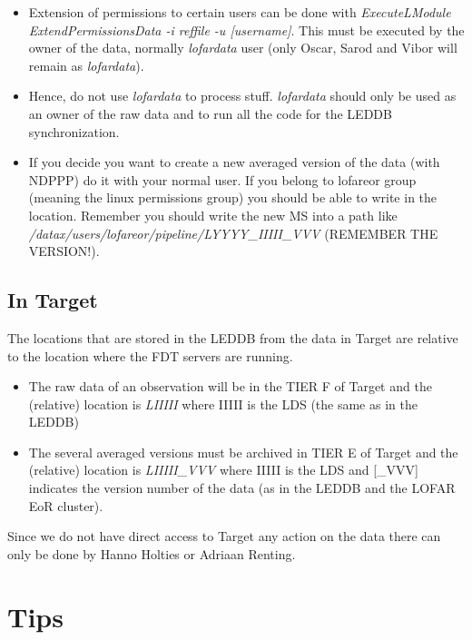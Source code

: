 \documentclass[a4paper,11pt]{article}
\begin{document}
\begin{itemize}
\item Extension of permissions to certain users can be done with \textit{ExecuteLModule ExtendPermissionsData -i reffile -u [username]}.
This must be executed by the owner of the data, normally \textit{lofardata} user (only Oscar, Sarod and Vibor will remain as \textit{lofardata}).

\item Hence, do not use \textit{lofardata} to process stuff. \textit{lofardata} should only be used as an owner of the raw data and to run all the code for the LEDDB synchronization.

\item If you decide you want to create a new averaged version of the data (with NDPPP) do it with your normal user.
If you belong to lofareor group (meaning the linux permissions group) you should be able to write in the location. 
Remember you should write the new MS into a path like \textit{/datax/users/lofareor/pipeline/LYYYY\_IIIII\_VVV} (REMEMBER THE VERSION!).
\end{itemize}

\subsection{In Target}

The locations that are stored in the LEDDB from the data in Target are relative to the location where the FDT servers  are running. 

\begin{itemize}
	\item The raw data of an observation will be in the TIER F of Target and the (relative) location is \textit{LIIIII} where IIIII is the LDS (the same as in the LEDDB)
	\item The several averaged versions must be archived in TIER E of Target and the (relative) location is \textit{LIIIII\_VVV} where IIIII is the LDS and [\_VVV] indicates the version number of the data (as in the LEDDB and the LOFAR EoR cluster).
\end{itemize}

Since we do not have direct access to Target any action on the data there can only be done by Hanno Holties or Adriaan Renting.

\newpage


\section {Tips}
\end{document}
